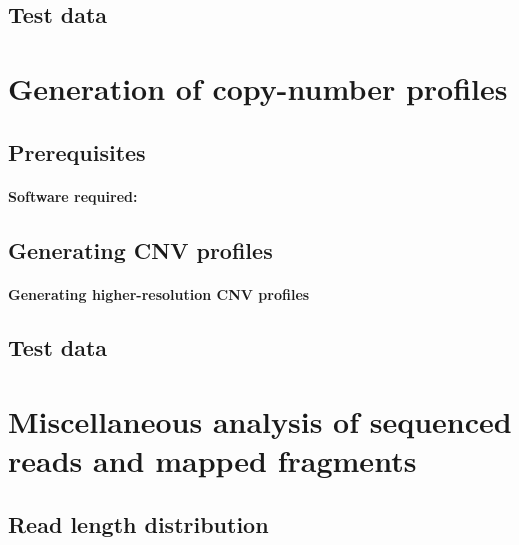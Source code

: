 \documentclass[11pt]{article}
\begin{document}
\subsection{Test data}


\section{Generation of copy-number profiles}
\label{cnv}

\subsection{Prerequisites}
\paragraph{Software required:}

\subsection{Generating CNV profiles}

\paragraph{Generating higher-resolution CNV profiles}

\subsection{Test data}


\section{Miscellaneous analysis of sequenced reads and mapped fragments}

\subsection{Read length distribution}
\end{document}
